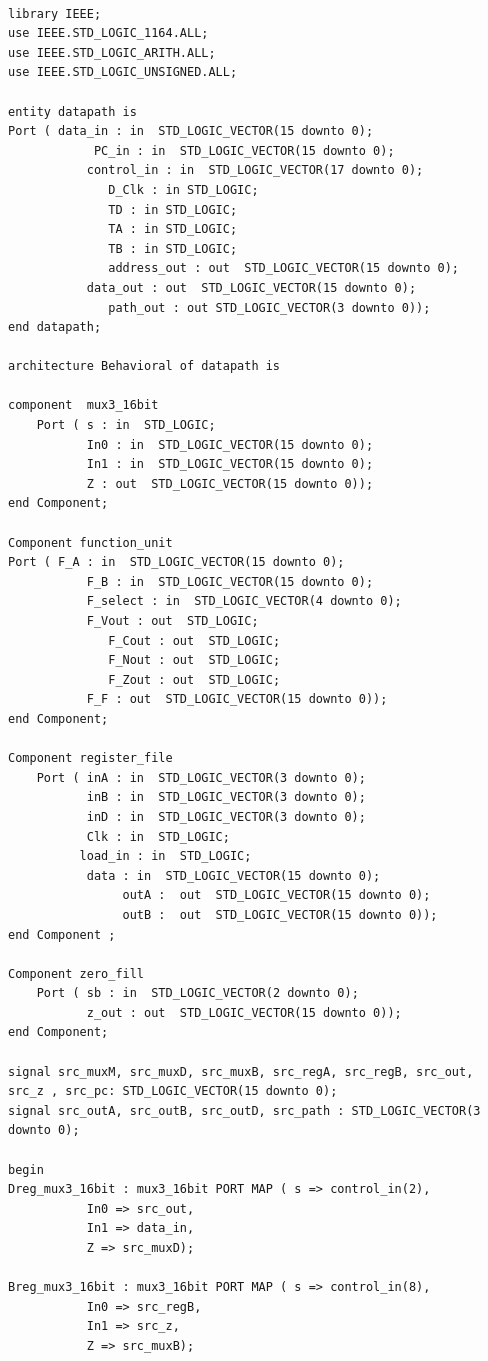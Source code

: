 \documentclass{article}
\begin{document}
\begin{lstlisting}

library IEEE;
use IEEE.STD_LOGIC_1164.ALL;
use IEEE.STD_LOGIC_ARITH.ALL;
use IEEE.STD_LOGIC_UNSIGNED.ALL;

entity datapath is
Port ( data_in : in  STD_LOGIC_VECTOR(15 downto 0);
			PC_in : in  STD_LOGIC_VECTOR(15 downto 0);
           control_in : in  STD_LOGIC_VECTOR(17 downto 0);
			  D_Clk : in STD_LOGIC;
			  TD : in STD_LOGIC;
			  TA : in STD_LOGIC;
			  TB : in STD_LOGIC;
			  address_out : out  STD_LOGIC_VECTOR(15 downto 0);
           data_out : out  STD_LOGIC_VECTOR(15 downto 0);
			  path_out : out STD_LOGIC_VECTOR(3 downto 0));
end datapath;

architecture Behavioral of datapath is

component  mux3_16bit
    Port ( s : in  STD_LOGIC;
           In0 : in  STD_LOGIC_VECTOR(15 downto 0);
           In1 : in  STD_LOGIC_VECTOR(15 downto 0);
           Z : out  STD_LOGIC_VECTOR(15 downto 0));
end Component;

Component function_unit
Port ( F_A : in  STD_LOGIC_VECTOR(15 downto 0);
           F_B : in  STD_LOGIC_VECTOR(15 downto 0);
           F_select : in  STD_LOGIC_VECTOR(4 downto 0);
           F_Vout : out  STD_LOGIC;
			  F_Cout : out  STD_LOGIC;
			  F_Nout : out  STD_LOGIC;
			  F_Zout : out  STD_LOGIC;
           F_F : out  STD_LOGIC_VECTOR(15 downto 0));
end Component;

Component register_file 
    Port ( inA : in  STD_LOGIC_VECTOR(3 downto 0);
           inB : in  STD_LOGIC_VECTOR(3 downto 0);
           inD : in  STD_LOGIC_VECTOR(3 downto 0);
           Clk : in  STD_LOGIC;
          load_in : in  STD_LOGIC;
           data : in  STD_LOGIC_VECTOR(15 downto 0);
				outA :  out  STD_LOGIC_VECTOR(15 downto 0);
				outB :  out  STD_LOGIC_VECTOR(15 downto 0));
end Component ;

Component zero_fill
    Port ( sb : in  STD_LOGIC_VECTOR(2 downto 0);
           z_out : out  STD_LOGIC_VECTOR(15 downto 0));
end Component;

signal src_muxM, src_muxD, src_muxB, src_regA, src_regB, src_out, src_z , src_pc: STD_LOGIC_VECTOR(15 downto 0);
signal src_outA, src_outB, src_outD, src_path : STD_LOGIC_VECTOR(3 downto 0);

begin
Dreg_mux3_16bit : mux3_16bit PORT MAP ( s => control_in(2),
           In0 => src_out,
           In1 => data_in,
           Z => src_muxD);

Breg_mux3_16bit : mux3_16bit PORT MAP ( s => control_in(8),
           In0 => src_regB,
           In1 => src_z,
           Z => src_muxB);


\end{lstlisting}
\end{document}
